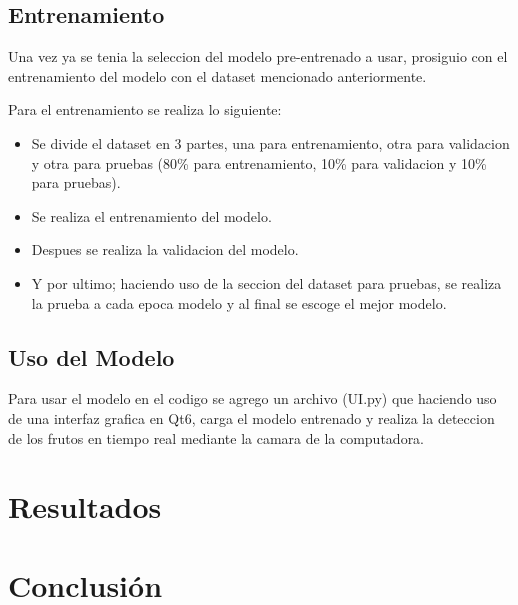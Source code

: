 \documentclass[conference]{IEEEtran}
\begin{document}
\subsection{Entrenamiento}
Una vez ya se tenia la seleccion del modelo pre-entrenado a usar, prosiguio con el entrenamiento del modelo con el dataset mencionado anteriormente\cite{}.

Para el entrenamiento se realiza lo siguiente:
\begin{itemize}
    \item Se divide el dataset en 3 partes, una para entrenamiento, otra para validacion y otra para pruebas (80\% para entrenamiento, 10\% para validacion y 10\% para pruebas).
    \item Se realiza el entrenamiento del modelo.
    \item Despues se realiza la validacion del modelo.
    \item Y por ultimo; haciendo uso de la seccion del dataset para pruebas, se realiza la prueba a cada epoca modelo y al final se escoge el mejor modelo.
\end{itemize}

\subsection{Uso del Modelo}
Para usar el modelo en el codigo se agrego un archivo (UI.py) que haciendo uso de una interfaz grafica en Qt6, carga el modelo entrenado y realiza la deteccion de los frutos en tiempo real mediante la camara de la computadora.

\section{Resultados}


\section{Conclusión}


\nocite{calcularRangos}
\printbibliography
\end{document}
